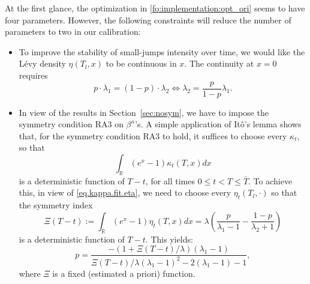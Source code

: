 \documentclass{article}
\numberwithin{equation}{section}
\newcommand\RR {\mathbb R}
\begin{document}
At the first glance, the optimization in \eqref{fo:implementation:opt_ori} seems to have four parameters. However, the following constraints will reduce the number of parameters to two in our calibration:
\begin{itemize}
\item To improve the stability of small-jumps intensity over time, we would like the L\'evy density $\eta(T_l,x)$ to be continuous in $x$. The continuity at $x = 0$ requires
\begin{equation} \label{fo:implementation:etacont}
p \cdot \lambda_1 = (1-p) \cdot \lambda_2 \Leftrightarrow \lambda_2 = \frac{p}{1-p} \lambda_1.
\end{equation}

\item In view of the results in Section~\ref{sec:nosym}, we have to impose the symmetry condition RA3 on $\beta^n$'s. A simple application of It\^o's lemma shows that, for the symmetry condition RA3 to hold, it suffices to choose every $\kappa_t$, so that
$$
\int_\RR (e^x-1) \kappa_t(T,x) dx
$$
is a deterministic function of $T-t$, for all times $0\leq t<T\leq \bar{T}$. To achieve this, in view of \eqref{eq.kappa.fit.eta}, we need to choose every $\eta_t(T_l,\cdot)$ so that the symmetry index
\begin{equation} \label{fo:implementation:symmetry}
\Xi(T-t) := \int_\RR (e^x-1) \eta_t(T,x) dx = \lambda\left( \frac{p}{\lambda_1 - 1} - \frac{1-p}{\lambda_2 + 1} \right)
\end{equation}
is a deterministic function of $T-t$.
This yields:
\begin{equation}
p = \frac{-(1+\Xi(T-t)/\lambda)(\lambda_1 -1)}{\Xi(T-t)/\lambda(\lambda_1 -1)^2 - 2(\lambda_1-1) - 1},
\end{equation}
where $\Xi$ is a fixed (estimated a priori) function.
\end{itemize}
\end{document}
